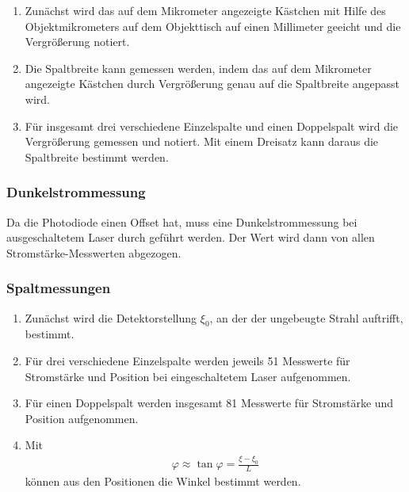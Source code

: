 \begin{enumerate}

\item Zunächst wird das auf dem Mikrometer angezeigte Kästchen mit Hilfe
des Objektmikrometers auf dem Objekttisch auf einen Millimeter geeicht und
die Vergrößerung notiert.

\item Die Spaltbreite kann gemessen werden, indem das auf dem Mikrometer
angezeigte Kästchen durch Vergrößerung genau auf die Spaltbreite angepasst
wird.

\item Für insgesamt drei verschiedene Einzelspalte und einen Doppelspalt
wird die Vergrößerung gemessen und notiert.
Mit einem Dreisatz kann daraus die Spaltbreite bestimmt werden.

\end{enumerate}

\subsubsection{Dunkelstrommessung}

Da die Photodiode einen Offset hat, muss eine Dunkelstrommessung bei
ausgeschaltetem Laser durch geführt werden. Der Wert wird dann von allen
Stromstärke-Messwerten abgezogen.

\subsubsection{Spaltmessungen}

\begin{enumerate}

\item Zunächst wird die Detektorstellung $\xi_0$, an der der ungebeugte Strahl
auftrifft, bestimmt.

\item Für drei verschiedene Einzelspalte werden jeweils 51 Messwerte für
Stromstärke und Position bei eingeschaltetem Laser aufgenommen.

\item Für einen Doppelspalt werden insgesamt 81 Messwerte für Stromstärke
und Position aufgenommen.

\item Mit
\begin{align}
  \varphi \approx \tan{\varphi} = \frac{\xi - \xi_0}{L}
\end{align}
können aus den Positionen die Winkel bestimmt werden.

\end{enumerate}
